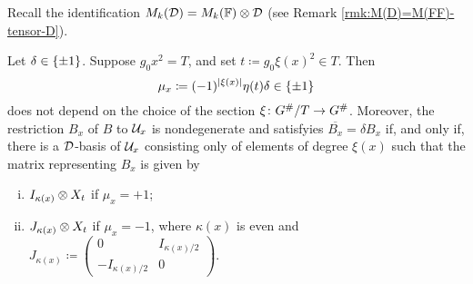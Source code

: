 Recall the identification $M_k (\mathcal{D}) = M_k(\mathbb{F}) \otimes \mathcal{D}$ (see Remark \ref{rmk:M(D)=M(FF)-tensor-D}). 


\begin{prop}\label{prop:self-dual-components}
    Let $\delta \in \{ \pm 1 \}$. 
    Suppose $g_0 x^2 = T$,  and  set $t \coloneqq g_0\xi(x)^2 \in T$. 
    Then 
    \begin{equation}\label{eq:mu_x}
        \mu_{x} \coloneqq (-1)^{|\xi(x)|} \eta(t) \delta \in \{ \pm 1 \}
    \end{equation}
    does not depend on the choice of the section $\xi\colon G^\#/T \to G^\#$. 
    Moreover, the restriction $B_x$ of $B$ to $\mathcal U_x$ is nondegenerate and satisfyies $\overline{B_x} = \delta B_x$ if, and only if, there is a $\mathcal{D}$-basis of $\mathcal U_{x}$ consisting only of elements of degree $\xi(x)$ such that the matrix representing $B_x$ is given by
    \begin{enumerate}[(i)]
        \item $I_{\kappa(x)} \otimes X_t$ if $\mu_x = +1$;
        \item $J_{\kappa(x)} \otimes X_t$ if $\mu_{x} = -1$, where $\kappa (x)$ is even and $J_{\kappa(x)} \coloneqq \begin{pmatrix}
        0 & I_{\kappa(x)/2}\\
        -I_{\kappa(x)/2} & 0
    \end{pmatrix}$.
    \end{enumerate}
\end{prop}

